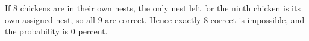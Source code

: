 If $8$ chickens are in their own nests, the only nest left for the ninth chicken is its own assigned nest, so all $9$ are correct. Hence exactly $8$ correct is impossible, and the probability is $\boxed{0}$ percent.
